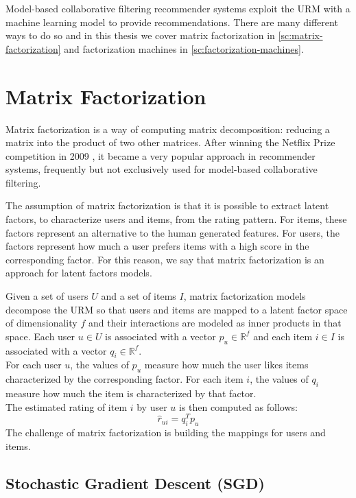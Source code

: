 Model-based collaborative filtering recommender systems exploit the URM with a machine learning model to provide recommendations. There are many different ways to do so and in this thesis we cover matrix factorization in \autoref{sc:matrix-factorization} and factorization machines in \autoref{sc:factorization-machines}.



\section{Matrix Factorization}
\label{sc:matrix-factorization}

Matrix factorization \cite{10.1109/MC.2009.263} is a way of computing matrix decomposition: reducing a matrix into the product of two other matrices. After winning the Netflix Prize competition in 2009 \cite{netflix-prize}, it became a very popular approach in recommender systems, frequently but not exclusively used for model-based collaborative filtering.\par
The assumption of matrix factorization is that it is possible to extract latent factors, to characterize users and items, from the rating pattern. For items, these factors represent an alternative to the human generated features. For users, the factors represent how much a user prefers items with a high score in the corresponding factor. For this reason, we say that matrix factorization is an approach for latent factors models.\par
Given a set of users $U$ and a set of items $I$, matrix factorization models decompose the URM so that users and items are mapped to a latent factor space of dimensionality $f$ and their interactions are modeled as inner products in that space. Each user $u \in U$ is associated with a vector $p_u \in \mathbb{R}^f$ and each item $i \in I$ is associated with a vector $q_i \in \mathbb{R}^f$.\\
For each user $u$, the values of $p_u$ measure how much the user likes items characterized by the corresponding factor. For each item $i$, the values of $q_i$ measure how much the item is characterized by that factor.\\
The estimated rating of item $i$ by user $u$ is then computed as follows:
\begin{equation*}
\hat{r}_{ui} = q_i^T p_u
\end{equation*}
The challenge of matrix factorization is building the mappings for users and items.


\subsection{Stochastic Gradient Descent (SGD)}

